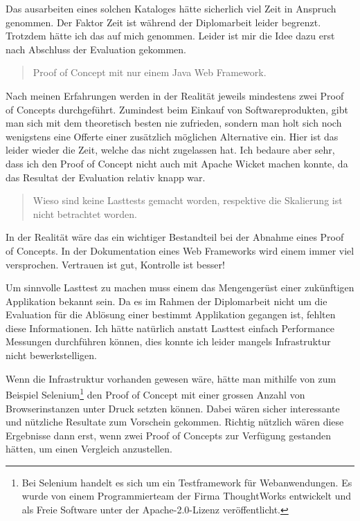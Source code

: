 Das ausarbeiten eines solchen Kataloges hätte sicherlich viel Zeit in Anspruch
genommen. Der Faktor Zeit ist während der Diplomarbeit leider begrenzt. Trotzdem
hätte ich das auf mich genommen. Leider ist mir die Idee dazu erst nach
Abschluss der Evaluation gekommen.
\newline
  
\begin{quote}\begin{itshape}Proof of Concept mit nur einem Java Web
Framework.\end{itshape}\end{quote}

Nach meinen Erfahrungen werden in der Realität jeweils mindestens zwei Proof of
Concepts durchgeführt. Zumindest beim Einkauf von Softwareprodukten, gibt man
sich mit dem theoretisch besten nie zufrieden, sondern man holt sich noch
wenigstens eine Offerte einer zusätzlich möglichen Alternative ein. Hier ist das
leider wieder die Zeit, welche das nicht zugelassen hat. Ich bedaure aber sehr,
dass ich den Proof of Concept nicht auch mit Apache Wicket machen konnte, da das
Resultat der Evaluation relativ knapp war.
\newline

\begin{quote}\begin{itshape}Wieso sind keine Lasttests gemacht worden,
respektive die Skalierung ist nicht betrachtet worden.\end{itshape}\end{quote}

In der Realität wäre das ein wichtiger Bestandteil bei der Abnahme eines Proof
of Concepts. In der Dokumentation eines Web Frameworks wird einem immer viel
versprochen. Vertrauen ist gut, Kontrolle ist besser! 

Um sinnvolle Lasttest zu machen muss einem das Mengengerüst einer zukünftigen
Applikation bekannt sein. Da es im Rahmen der Diplomarbeit nicht um die
Evaluation für die Ablösung einer bestimmt Applikation gegangen ist, fehlten
diese Informationen. Ich hätte natürlich anstatt Lasttest einfach Performance
Messungen durchführen können, dies konnte ich leider mangels Infrastruktur nicht
bewerkstelligen.

Wenn die Infrastruktur vorhanden gewesen wäre, hätte man mithilfe von
zum Beispiel Selenium\footnote{Bei Selenium handelt es sich um ein
Testframework für Webanwendungen. Es wurde von einem Programmierteam der
Firma ThoughtWorks entwickelt und als Freie Software unter der
Apache-2.0-Lizenz veröffentlicht.} den Proof of Concept mit einer grossen Anzahl
von Browserinstanzen unter Druck setzten können. Dabei wären sicher interessante
und nützliche Resultate zum Vorschein gekommen. Richtig nützlich wären diese
Ergebnisse dann erst, wenn zwei Proof of Concepts zur Verfügung gestanden
hätten, um einen Vergleich anzustellen.

